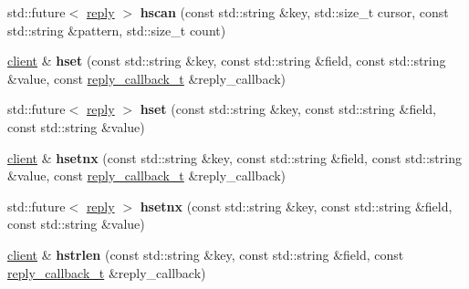 \begin{DoxyCompactItemize}
\item 
\mbox{\label{classcpp__redis_1_1client_a9d66932a3fdbcf062b436789b6850148}} 
std\+::future$<$ \hyperlink{classcpp__redis_1_1reply}{reply} $>$ {\bfseries hscan} (const std\+::string \&key, std\+::size\+\_\+t cursor, const std\+::string \&pattern, std\+::size\+\_\+t count)
\item 
\mbox{\label{classcpp__redis_1_1client_a3d5367719dc31fb3dfa49202d1e7f9ad}} 
\hyperlink{classcpp__redis_1_1client}{client} \& {\bfseries hset} (const std\+::string \&key, const std\+::string \&field, const std\+::string \&value, const \hyperlink{classcpp__redis_1_1client_a061a1140d36d2eaeda82b09a0bb3f9f2}{reply\+\_\+callback\+\_\+t} \&reply\+\_\+callback)
\item 
\mbox{\label{classcpp__redis_1_1client_ae212c8371dbd9ceff386f789226eb173}} 
std\+::future$<$ \hyperlink{classcpp__redis_1_1reply}{reply} $>$ {\bfseries hset} (const std\+::string \&key, const std\+::string \&field, const std\+::string \&value)
\item 
\mbox{\label{classcpp__redis_1_1client_a6cf21d60012fc82075deb801a32e8d60}} 
\hyperlink{classcpp__redis_1_1client}{client} \& {\bfseries hsetnx} (const std\+::string \&key, const std\+::string \&field, const std\+::string \&value, const \hyperlink{classcpp__redis_1_1client_a061a1140d36d2eaeda82b09a0bb3f9f2}{reply\+\_\+callback\+\_\+t} \&reply\+\_\+callback)
\item 
\mbox{\label{classcpp__redis_1_1client_a72b5a16cc761f51e9986bcfcf644e999}} 
std\+::future$<$ \hyperlink{classcpp__redis_1_1reply}{reply} $>$ {\bfseries hsetnx} (const std\+::string \&key, const std\+::string \&field, const std\+::string \&value)
\item 
\mbox{\label{classcpp__redis_1_1client_a5e1543cd782d3ff9d17de5e200fd038a}} 
\hyperlink{classcpp__redis_1_1client}{client} \& {\bfseries hstrlen} (const std\+::string \&key, const std\+::string \&field, const \hyperlink{classcpp__redis_1_1client_a061a1140d36d2eaeda82b09a0bb3f9f2}{reply\+\_\+callback\+\_\+t} \&reply\+\_\+callback)
\item 
\mbox{\label{classcpp__redis_1_1client_a612c5f64a9fec6c8c2df8b113173146a}} 

\end{DoxyCompactItemize}
